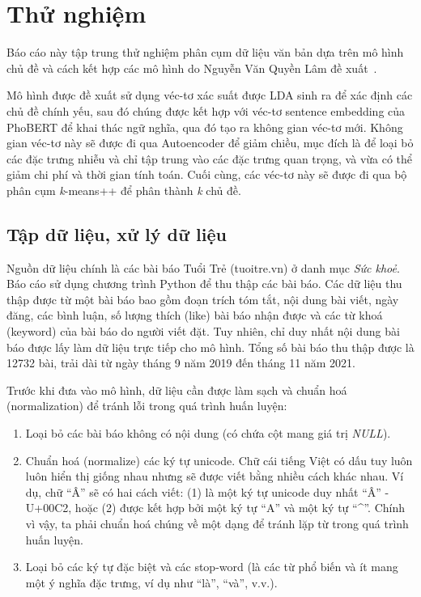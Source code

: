 \section{Thử nghiệm}
\label{sec:experiments}

Báo cáo này tập trung thử nghiệm phân cụm dữ liệu văn bản dựa trên mô hình chủ
đề và cách kết hợp các mô hình do Nguyễn Văn Quyền Lâm đề
xuất~\cite{lamGomCumVan2021}.

Mô hình được đề xuất sử dụng véc-tơ xác suất được LDA sinh ra để xác định các
chủ đề chính yếu, sau đó chúng được kết hợp với véc-tơ sentence embedding của
PhoBERT để khai thác ngữ nghĩa, qua đó tạo ra không gian véc-tơ mới. Không gian
véc-tơ này sẽ được đi qua Autoencoder để giảm chiều, mục đích là để loại bỏ các
đặc trưng nhiễu và chỉ tập trung vào các đặc trưng quan trọng, và vừa có thể
giảm chi phí và thời gian tính toán. Cuối cùng, các véc-tơ này sẽ được đi qua
bộ phân cụm \textit{k}-means++ để phân thành \textit{k} chủ đề.


\subsection{Tập dữ liệu, xử lý dữ liệu}

Nguồn dữ liệu chính là các bài báo Tuổi Trẻ (tuoitre.vn) ở danh mục \textit{Sức
khoẻ}. Báo cáo sử dụng chương trình Python để thu thập các bài báo. Các dữ liệu
thu thập được từ một bài báo bao gồm đoạn trích tóm tắt, nội dung bài viết,
ngày đăng, các bình luận, số lượng thích (like) bài báo nhận được và các từ
khoá (keyword) của bài báo do người viết đặt. Tuy nhiên, chỉ duy nhất nội dung
bài báo được lấy làm dữ liệu trực tiếp cho mô hình. Tổng số bài báo thu thập
được là 12732 bài, trải dài từ ngày tháng 9 năm 2019 đến tháng 11 năm 2021.

Trước khi đưa vào mô hình, dữ liệu cần được làm sạch và chuẩn hoá
(normalization) để tránh lỗi trong quá trình huấn luyện:
\begin{enumerate}
    \item Loại bỏ các bài báo không có nội dung (có chứa cột mang giá trị
        \textit{NULL}).
    \item Chuẩn hoá (normalize) các ký tự unicode. Chữ cái tiếng Việt có dấu
        tuy luôn luôn hiển thị giống nhau nhưng sẽ được viết bằng nhiều cách
        khác nhau. Ví dụ, chữ ``Â'' sẽ có hai cách viết: (1) là một ký tự unicode
        duy nhất ``Â'' - U+00C2, hoặc (2) được kết hợp bởi một ký tự ``A'' và một
        ký tự ``\^{}''. Chính vì vậy, ta phải chuẩn hoá chúng về một dạng để tránh
        lặp từ trong quá trình huấn luyện.
    \item Loại bỏ các ký tự đặc biệt và các stop-word (là các từ phổ biến và ít
        mang một ý nghĩa đặc trưng, ví dụ như ``là'', ``và'', v.v.).
\end{enumerate}

